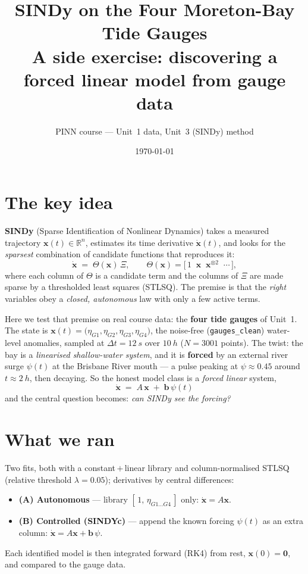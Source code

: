 \documentclass[11pt]{article}
\title{\vspace{-1.2cm}\textbf{SINDy on the Four Moreton-Bay Tide Gauges}\\[2pt]
\large A side exercise: discovering a forced linear model from gauge data}
\author{PINN course --- Unit~1 data, Unit~3 (SINDy) method}
\date{\today}
\begin{document}
\maketitle
\vspace{-0.6cm}

\section*{The key idea}

\textbf{SINDy} (Sparse Identification of Nonlinear Dynamics) takes a measured
trajectory $\mathbf{x}(t)\in\mathbb{R}^n$, estimates its time derivative
$\dot{\mathbf{x}}(t)$, and looks for the \emph{sparsest} combination of candidate
functions that reproduces it:
\[
  \dot{\mathbf{x}} \;=\; \Theta(\mathbf{x})\,\Xi,
  \qquad
  \Theta(\mathbf{x}) = \big[\,1\;\;\mathbf{x}\;\;\mathbf{x}^{\otimes 2}\;\;\cdots\,\big],
\]
where each column of $\Theta$ is a candidate term and the columns of $\Xi$ are
made sparse by a thresholded least squares (STLSQ). The premise is that the
\emph{right} variables obey a \emph{closed, autonomous} law with only a few active
terms.

Here we test that premise on real course data: the \textbf{four tide gauges} of
Unit~1. The state is
$\mathbf{x}(t)=\big(\eta_{G1},\eta_{G2},\eta_{G3},\eta_{G4}\big)$, the noise-free
(\texttt{gauges\_clean}) water-level anomalies, sampled at $\Delta t=\SI{12}{s}$
over $\SI{10}{h}$ ($N=3001$ points). The twist: the bay is a \emph{linearised
shallow-water system}, and it is \textbf{forced} by an external river surge
$\psi(t)$ at the Brisbane River mouth --- a pulse peaking at $\psi\approx0.45$
around $t\approx\SI{2}{h}$, then decaying. So the honest model class is a
\emph{forced linear} system,
\[
  \boxed{\;\dot{\mathbf{x}} \;=\; A\,\mathbf{x} \;+\; \mathbf{b}\,\psi(t)\;}
\]
and the central question becomes: \emph{can SINDy see the forcing?}

\section*{What we ran}

Two fits, both with a constant\,$+$\,linear library and column-normalised STLSQ
(relative threshold $\lambda=0.05$); derivatives by central differences:
\begin{itemize}\itemsep1pt
  \item \textbf{(A) Autonomous} --- library $[\,1,\,\eta_{G1\ldots G4}\,]$ only:
        $\dot{\mathbf{x}}=A\mathbf{x}$.
  \item \textbf{(B) Controlled (SINDYc)} --- append the known forcing $\psi(t)$ as
        an extra column: $\dot{\mathbf{x}}=A\mathbf{x}+\mathbf{b}\,\psi$.
\end{itemize}
Each identified model is then integrated forward (RK4) from rest,
$\mathbf{x}(0)=\mathbf{0}$, and compared to the gauge data.
\end{document}

